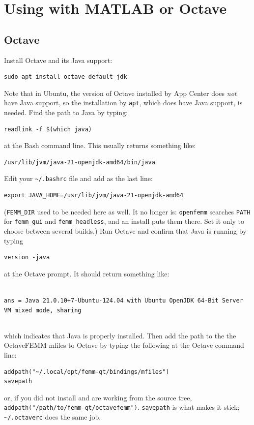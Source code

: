 \documentclass[11pt]{article}
\begin{document}
\section{Using with MATLAB or Octave}

\subsection{Octave}

Install Octave and its Java support:
\begin{lstlisting}
sudo apt install octave default-jdk
\end{lstlisting}
Note that in Ubuntu, the version of Octave installed by App Center does \textit{not} have Java support, so the installation by \texttt{apt}, which does have Java support, is needed.
Find the path to Java by typing:
\begin{lstlisting}
readlink -f $(which java)
\end{lstlisting}
at the Bash command line.  This usually returns something like: 
\begin{lstlisting}
/usr/lib/jvm/java-21-openjdk-amd64/bin/java
\end{lstlisting}
Edit your \verb+~/.bashrc+ file and add as the last line:
\begin{lstlisting}
export JAVA_HOME=/usr/lib/jvm/java-21-openjdk-amd64
\end{lstlisting}
(\texttt{FEMM\_DIR} used to be needed here as well.  It no longer is:
\texttt{openfemm} searches \texttt{PATH} for \texttt{femm\_gui} and
\texttt{femm\_headless}, and an install puts them there.  Set it only to
choose between several builds.)
Run Octave and confirm that Java is running by typing
\begin{lstlisting}
version -java
\end{lstlisting}
at the Octave prompt.  It should return something like: 
\\ \\
\begin{small} \texttt{ans =  Java 21.0.10+7-Ubuntu-124.04 with Ubuntu OpenJDK 64-Bit Server VM mixed mode, sharing} \end{small} \\
which indicates that Java is properly installed.  Then add the path to the the OctaveFEMM mfiles to Octave by typing the following at the Octave command line:
\begin{lstlisting}
addpath("~/.local/opt/femm-qt/bindings/mfiles")
savepath
\end{lstlisting}
or, if you did not install and are working from the source tree,
\verb+addpath("/path/to/femm-qt/octavefemm")+.  \texttt{savepath} is what
makes it stick; \texttt{\textasciitilde/.octaverc} does the same job.
\end{document}
